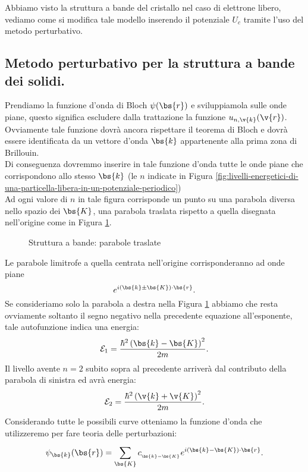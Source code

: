 Abbiamo visto la struttura a bande del cristallo nel caso di elettrone libero, vediamo come si modifica tale modello inserendo il potenziale $U_c$ tramite l'uso del metodo perturbativo.\\
\subsection{Metodo perturbativo per la struttura a bande dei solidi.}
\label{subsec:Metodo perturbativo per la struttura a bande dei solidi.}
Prendiamo la funzione d'onda di Bloch $\psi(\bs{r})$ e sviluppiamola sulle onde piane, questo significa escludere dalla trattazione la funzione $u_{n,\v{k}}(\v{r})$.\\ 
Ovviamente tale funzione dovrà ancora rispettare il teorema di Bloch e dovrà essere identificata da un vettore d'onda $\bs{k}$ appartenente alla prima zona di Brillouin. \\
Di conseguenza dovremmo inserire in tale funzione d'onda tutte le onde piane che corrispondono allo stesso $\bs{k}$ (le $n$ indicate in Figura \ref{fig:livelli-energetici-di-una-particella-libera-in-un-potenziale-periodico})\\
Ad ogni valore di $n$ in tale figura corrisponde un punto su una parabola diversa nello spazio dei $\bs{K}$, una parabola traslata rispetto a quella disegnata nell'origine come in Figura \ref{fig:struttura-a-bande-parabole-traslate}.\\
\begin{figure}[ht]
    \centering
    \caption{Struttura a bande: parabole traslate}
    \label{fig:struttura-a-bande-parabole-traslate}
\end{figure}
\noindent
Le parabole limitrofe a quella centrata nell'origine corrisponderanno ad onde piane 
\[
	e^{i\left( \bs{k}\pm\bs{K} \right) \cdot\bs{r}}
.\] 
Se consideriamo solo la parabola a destra nella Figura \ref{fig:struttura-a-bande-parabole-traslate} abbiamo che resta ovviamente soltanto il segno negativo nella precedente equazione all'esponente, tale autofunzione indica una energia:
\[
	\mathcal{E}_1=\frac{\hbar ^2\left( \bs{k}-\bs{K} \right)^2}{2m}
.\] 
Il livello avente $n=2$ subito sopra al precedente arriverà dal contributo della parabola di sinistra ed avrà energia:
\[
    \mathcal{E}_2=\frac{\hbar ^2\left(\v{k}+\v{K}\right)^2}{2m}
.\] 
Considerando tutte le possibili curve otteniamo la funzione d'onda che utilizzeremo per fare teoria delle perturbazioni:
\[
	\psi_{\bs{k}}(\bs{r}) = 
	\sum_{\bs{K}}^{} c_{_{\bs{k}-\bs{K}}}
	e^{i\left( \bs{k}-\bs{K} \right)\cdot\bs{r}}
.\] 

